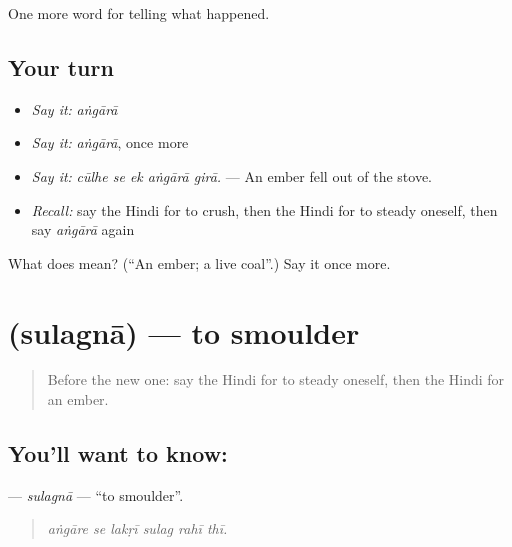 \begin{grammarlens}[title={What you've built}]
One more word for telling what happened.
\end{grammarlens}

\subsection*{Your turn}
\begin{itemize}
\raggedright
  \item \emph{Say it:} \emph{aṅgārā}
  \item \emph{Say it:} \emph{aṅgārā}, once more
  \item \emph{Say it:} \emph{cūlhe se ek aṅgārā girā.} — An ember fell out of the stove.
  \item \emph{Recall:} say the Hindi for to crush, then the Hindi for to steady oneself, then say \emph{aṅgārā} again
\end{itemize}

\begin{tcolorbox}[breakable,colback=teal!4,colframe=teal!35!black,title={Before you move on}]
What does  mean? (\textquotedblleft{}An ember; a live coal\textquotedblright{}.) Say it once more.
\end{tcolorbox}
\section[\texorpdfstring{\hi{सुलगना} (sulagnā)}{सुलगना (sulagnā)}]{ (sulagnā) — to smoulder}

\label{lesson:HI-C299-sulagna}



\begin{quote}
Before the new one: say the Hindi for to steady oneself, then the Hindi for an ember.
\end{quote}

\subsection*{You'll want to know: }
\textbf{} — \emph{sulagnā} — \textquotedblleft{}to smoulder\textquotedblright{}.

\begin{quote}
     
\end{quote}

\begin{quote}
\emph{aṅgāre se lakṛī sulag rahī thī.}
\end{quote}


